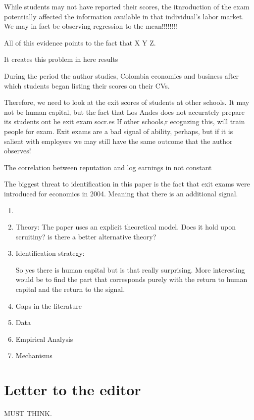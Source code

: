 \documentclass[a4paper, 11pt]{article}
\begin{document}
While students may not have reported their scores, the itnroduction of the exam potentially affected the information available in that individual's labor market.   We may in fact be observing regression to the mean!!!!!!!!

All of this evidence points to the fact that X Y Z.

It creates this problem in here results 

 


 During the period the author studies, Colombia  economics and business  after which students began listing their scores on their CVs.  

Therefore, we need to look at the exit scores of students at other schools.  It may not be human capital, but the fact that Los Andes does not accurately prepare its students ont he exit exam socr.es  If other schools,r ecognzing this, will train people for exam.  Exit exams are a bad signal of ability, perhaps, but if it is salient with employers we may still have the same outcome that the author observes! 

The correlation between reputation and log earnings in not constant



The biggest threat to identification in this paper is the fact that exit exams were introduced for economics in 2004.  Meaning that there is an additional signal. 

\begin{enumerate}
\item 
\item Theory: The paper uses an explicit theoretical model.  Does it hold upon scruitiny? is there a better alternative theory?
\item Identification strategy:  

So yes there is human capital but is that really surprising.  More interesting would be to find the part that corresponds purely with the return to human capital and the return to the signal. 

\item Gaps in the literature
\item Data
\item Empirical Analysis
\item Mechanisms
\end{enumerate}

\section*{Letter to the editor}
MUST THINK.  
\end{document}
